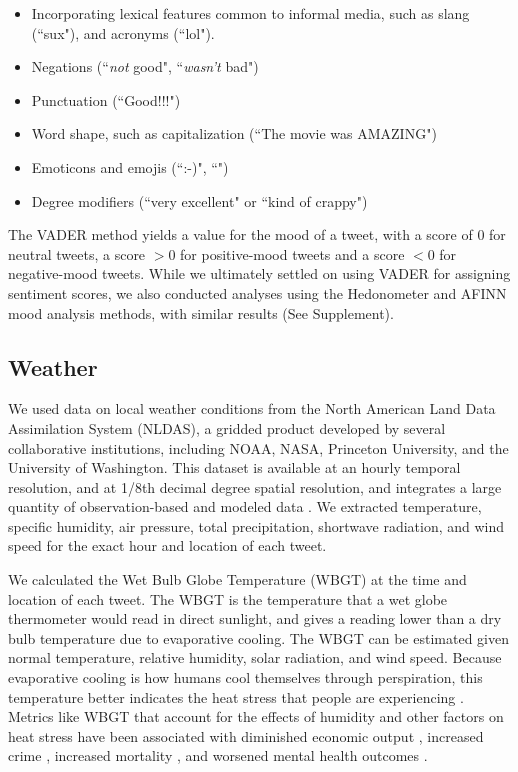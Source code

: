 \documentclass[fleqn,10pt]{wlscirep}
\begin{document}
\begin{itemize}
 \item Incorporating lexical features common to informal media, such as slang (``sux"), and acronyms (``lol").
 \item Negations (``\textit{not} good", ``\textit{wasn't} bad")
 \item Punctuation (``Good!!!")
 \item Word shape, such as capitalization (``The movie was AMAZING")
 \item Emoticons and emojis (``:-)", ``\emojismile")
 \item Degree modifiers (``very excellent" or ``kind of crappy")
\end{itemize} 

The VADER method yields a value for the mood of a tweet, with a score of 0 for neutral tweets, a score $> 0$ for positive-mood tweets and a score $< 0$ for negative-mood tweets. While we ultimately settled on using VADER for assigning sentiment scores, we also conducted analyses using the Hedonometer and AFINN mood analysis methods, with similar results (See Supplement).

\subsection*{Weather}
We used data on local weather conditions from the North American Land Data Assimilation System (NLDAS), a gridded product developed by several collaborative institutions, including NOAA, NASA, Princeton University, and the University of Washington. This dataset is available at an hourly temporal resolution, and at 1/8th decimal degree spatial resolution, and integrates a large quantity of observation-based and modeled data \cite{xia_continental-scale_2012}. We extracted temperature, specific humidity, air pressure, total precipitation, shortwave radiation, and wind speed for the exact hour and location of each tweet. 

We calculated the Wet Bulb Globe Temperature (WBGT) at the time and location of each tweet. The WBGT is the temperature that a wet globe thermometer would read in direct sunlight, and gives a reading lower than a dry bulb temperature due to evaporative cooling. The WBGT can be estimated given normal temperature, relative humidity, solar radiation, and wind speed. Because evaporative cooling is how humans cool themselves through perspiration, this temperature better indicates the heat stress that people are experiencing \cite{budd2008wet}. Metrics like WBGT that account for the effects of humidity and other factors on heat stress have been associated with diminished economic output \cite{rao2020projections}, increased crime \cite{hu2017impact}, increased mortality \cite{chien2016spatiotemporal, armstrong2019role}, and worsened mental health outcomes \cite{vida2012relationship, ding2016importance}.
\end{document}
